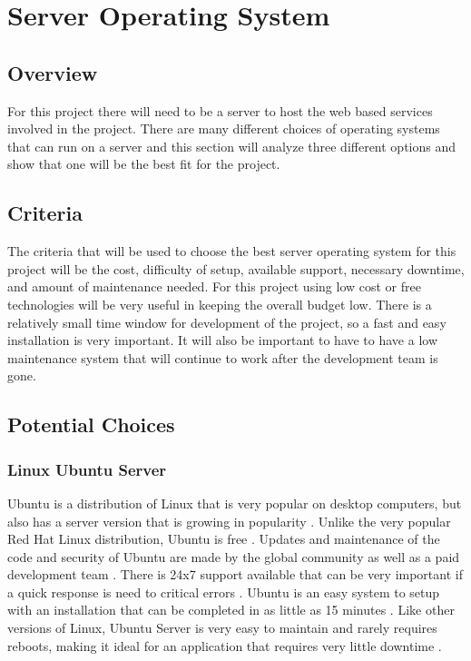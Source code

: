 \documentclass[onecolumn, draftclsnofoot,10pt, compsoc]{IEEEtran}
\begin{document}
\section{Server Operating System}

\subsection{Overview}
For this project there will need to be a server to host the web based services involved in the project. There are many different choices of operating systems that can run on a server and this section will analyze three different options and show that one will be the best fit for the project.

\subsection{Criteria}
The criteria that will be used to choose the best server operating system for this project will be the cost, difficulty of setup, available support, necessary downtime, and amount of maintenance needed. For this project using low cost or free technologies will be very useful in keeping the overall budget low. There is a relatively small time window for development of the project, so a fast and easy installation is very important. It will also be important to have to have a low maintenance system that will continue to work after the development team is gone.

\subsection{Potential Choices}

\subsubsection{Linux Ubuntu Server}
Ubuntu is a distribution of Linux that is very popular on desktop computers, but also has a server version that is growing in popularity \cite{ubuntu}. Unlike the very popular Red Hat Linux distribution, Ubuntu is free \cite{ubuntu}. Updates and maintenance of the code and security of Ubuntu are made by the global community as well as a paid development team \cite{ubuntu}. There is 24x7 support available that can be very important if a quick response is need to critical errors \cite{ubuntu}. Ubuntu is an easy system to setup with an installation that can be completed in as little as 15 minutes \cite{ubuntu}. Like other versions of Linux, Ubuntu Server is very easy to maintain and rarely requires reboots, making it ideal for an application that requires very little downtime \cite{ubuntu}. 
\end{document}
